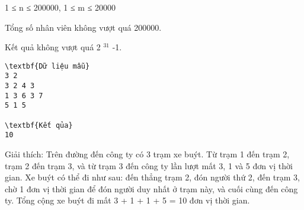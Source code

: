 1 ≤ n ≤ 200000, 1 ≤ m ≤ 20000  

   Tổng số nhân viên không vượt quá 200000.  

   Kết quả không vượt quá 2   $^    31   $   -1.
\begin{verbatim}
\textbf{Dữ liệu mẫu}
3 2
3 2 4 3
1 3 6 3 7
5 1 5

\textbf{Kết qủa}
10
\end{verbatim}

   Giải thích: Trên đường đến công ty có 3 trạm xe buýt. Từ trạm 1 đến trạm 2, trạm 2 đến trạm 3, và từ trạm 3 đến công ty lần lượt mất 3, 1 và 5 đơn vị thời gian. Xe buýt có thể đi như sau: đến thẳng trạm 2, đón người thứ 2, đến trạm 3, chờ 1 đơn vị thời gian để đón người duy nhất ở trạm này, và cuối cùng đến công ty. Tổng cộng xe buýt đi mất 3 + 1 + 1 + 5 = 10 đơn vị thời gian.